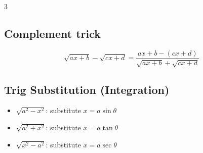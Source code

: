 \begin{multicols}{3}
\subsection*{Complement trick}
\[
\sqrt{ax+b}-\sqrt{cx+d}
=
\frac{ax+b-(cx+d)}
{\sqrt{ax+b}+\sqrt{cx+d}}
\]

\subsection*{Trig Substitution (Integration)}
\begin{itemize}[noitemsep, topsep=0pt, leftmargin=*]
\item $\sqrt{a^2-x^2}$: substitute $x=a\sin\theta$
\item $\sqrt{a^2+x^2}$: substitute $x=a\tan\theta$
\item $\sqrt{x^2-a^2}$: substitute $x=a\sec\theta$
\end{itemize}


\end{multicols}

